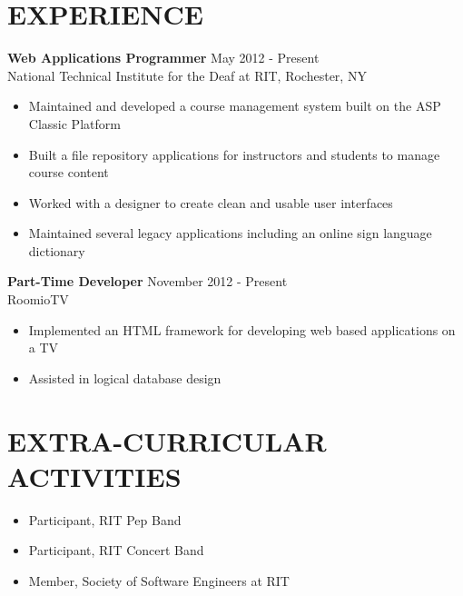 \documentclass[line,margin]{res}
\begin{document}
\begin{resume}
\section{EXPERIENCE} {\bf Web Applications Programmer} \hfill May 2012 - Present \\
               National Technical Institute for the Deaf at RIT, 
               Rochester, NY
               
                 \begin{itemize}  \itemsep -2pt %
                 \item Maintained and developed a course management system built on the ASP Classic Platform
                 \item Built a file repository applications for instructors and students to manage course content
                 \item Worked with a designer to create clean and usable user interfaces
                 \item Maintained several legacy applications including an online sign language dictionary
                \end{itemize}
 

   
                {\bf Part-Time Developer} \hfill            November 2012 - Present\\
                  RoomioTV
                  \begin{itemize}  \itemsep -2pt %
                     \item Implemented an HTML framework for developing web based applications on a TV
                     \item Assisted in logical database design
                 \end{itemize} 
 
				 \section{EXTRA-CURRICULAR \\ ACTIVITIES}             
				     \begin{itemize}  \itemsep -2pt 
						\item Participant, RIT Pep Band
				     	\item Participant, RIT Concert Band 
					 	\item Member, Society of Software Engineers at RIT
				 	\end{itemize} 
\end{resume}
\end{document}
